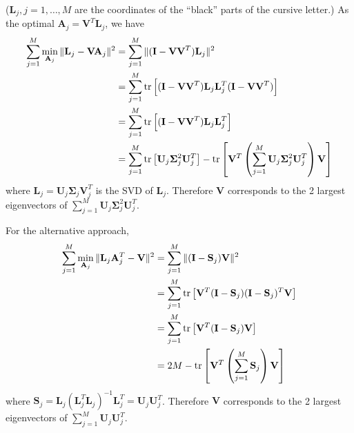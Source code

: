 \begin{exercise}
  ($\mathbf{L}_j, j=1,\ldots,M$ are the coordinates of the ``black'' parts of
  the cursive letter.) As the optimal $\mathbf{A}_j =
  \mathbf{V}^T\mathbf{L}_j$, we have
  \begin{align}
    \sum_{j = 1}^M\min_{\mathbf{A}_j}\|\mathbf{L}_j - \mathbf{V}\mathbf{A}_j\|^2
    &= \sum_{j = 1}^M\|(\mathbf{I} - \mathbf{VV}^T)\mathbf{L}_j\|^2 \notag \\
    &= \sum_{j = 1}^M\tr\left[(\mathbf{I} - \mathbf{VV}^T)
    \mathbf{L}_j\mathbf{L}_j^T (\mathbf{I} - \mathbf{VV}^T)\right] \notag\\
    &= \sum_{j = 1}^M\tr\left[(\mathbf{I} - \mathbf{VV}^T)
    \mathbf{L}_j\mathbf{L}_j^T \right] \notag \\
    &= \sum_{j =
    1}^M\tr\left[\mathbf{U}_j\mathbf{\Sigma}_j^2\mathbf{U}_j^T\right] -
    \tr\left[\mathbf{V}^T \left( \sum_{j = 1}^M
    \mathbf{U}_j\mathbf{\Sigma}_j^2\mathbf{U}_j^T\right) \mathbf{V}\right]
  \end{align}
  where $\mathbf{L}_j = \mathbf{U}_j\mathbf{\Sigma}_j\mathbf{V}_j^T$ is the SVD
  of $\mathbf{L}_j$. Therefore $\mathbf{V}$ corresponds to the 2 largest
  eigenvectors of $\sum_{j = 1}^M \mathbf{U}_j\mathbf{\Sigma}_j^2\mathbf{U}_j^T$.
  
  For the alternative approach,
  \begin{align}
    \sum_{j = 1}^M\min_{\mathbf{A}_j}\|\mathbf{L}_j\mathbf{A}_j^T -
    \mathbf{V}\|^2 &= \sum_{j = 1}^M\|(\mathbf{I} - \mathbf{S}_j)\mathbf{V}\|^2
    \notag \\
    &= \sum_{j = 1}^M\tr\left[\mathbf{V}^T (\mathbf{I} - \mathbf{S}_j)
    (\mathbf{I} - \mathbf{S}_j)^T \mathbf{V}\right] \notag \\
    &= \sum_{j = 1}^M\tr\left[\mathbf{V}^T (\mathbf{I} - \mathbf{S}_j)
    \mathbf{V}\right] \notag \\
    &= 2M - \tr\left[\mathbf{V}^T \left(\sum_{j = 1}^M\mathbf{S}_j\right)
    \mathbf{V}\right]
  \end{align}
  where $\mathbf{S}_j =
  \mathbf{L}_j(\mathbf{L}_j^T\mathbf{L}_j)^{-1} \mathbf{L}_j^T =
  \mathbf{U}_j\mathbf{U}_j^T$. Therefore $\mathbf{V}$ corresponds to the 2
  largest eigenvectors of $\sum_{j = 1}^M \mathbf{U}_j\mathbf{U}_j^T$.
\end{exercise}

\begin{exercise}[(Program)]
\end{exercise}

\begin{exercise}[(Program)]
\end{exercise}